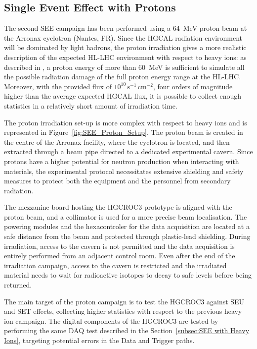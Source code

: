 \subsection{Single Event Effect with Protons}
\label{subsec:SEE with Protons}

The second SEE campaign has been performed using a 64~MeV proton beam at the Arronax cyclotron (Nantes, FR).
Since the HGCAL radiation environment will be dominated by light hadrons, the proton irradiation gives a more realistic description of the expected HL-LHC environment with respect to heavy ions: as described in \cite{federico}, a proton energy of more than 60~MeV is sufficient to simulate all the possible radiation damage of the full proton energy range at the HL-LHC. Moreover, with the provided flux of $10^{10}\,\textrm{s}^{-1}\,\textrm{cm}^{-2}$, four orders of magnitude higher than the average expected HGCAL flux, it is possible to collect enough statistics in a relatively short amount of irradiation time.

\bigbreak

The proton irradiation set-up is more complex with respect to heavy ions and is represented in Figure~\ref{fig:SEE_Proton_Setup}. The proton beam is created in the centre of the Arronax facility, where the cyclotron is located, and then extracted through a beam pipe directed to a dedicated experimental cavern. 
Since protons have a higher potential for neutron production when interacting with materials, the experimental protocol necessitates extensive shielding and safety measures to protect both the equipment and the personnel from secondary radiation. 

The mezzanine board hosting the HGCROC3 prototype is aligned with the proton beam, and a collimator is used for a more precise beam localisation. 
The powering modules and the hexacontroler for the data acquisition are located at a safe distance from the beam and protected through plastic-lead shielding.
During irradiation, access to the cavern is not permitted and the data acquisition is entirely performed from an adjacent control room. Even after the end of the irradiation campaign, access to the cavern is restricted and the irradiated material needs to wait for radioactive isotopes to decay to safe levels before being returned.

\bigbreak

The main target of the proton campaign is to test the HGCROC3 against SEU and SET effects, collecting higher statistics with respect to the previous heavy ion campaign. 
The digital components of the HGCROC3 are tested by performing the same DAQ test described in the Section~\ref{subsec:SEE with Heavy Ions}, targeting potential errors in the Data and Trigger paths.

